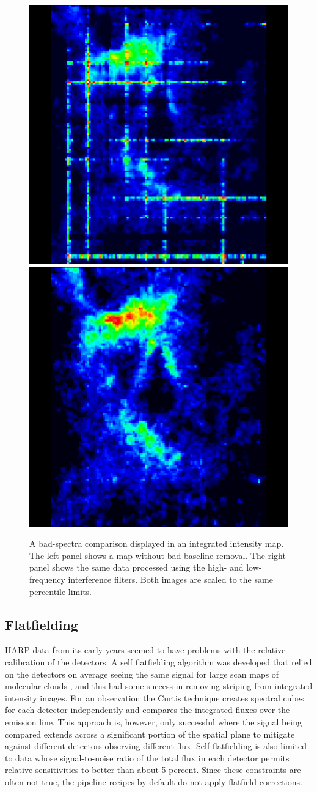 \documentclass[final,authoryear,5p,times,twocolumn]{elsarticle}
\begin{document}
\begin{figure}
\includegraphics[width=0.495\columnwidth]{NGC1333_with_badbaselines.png}
\includegraphics[width=0.495\columnwidth]{NGC1333_badbaselines_removed.png}
\caption{A bad-spectra comparison displayed in an integrated intensity map.
  The left panel shows a map without bad-baseline removal.  The right
  panel shows the same data processed using the high- and
  low-frequency interference filters.  Both images are scaled to the
  same percentile limits.}
\label{fig:badbase:results}
\end{figure}

\subsection{Flatfielding}

HARP data from its early years seemed to have problems with the
relative calibration of the detectors.  A self flatfielding algorithm
was developed that relied on the detectors on average seeing the same
signal for large scan maps of molecular clouds
\citep{2010MNRAS.401..455C}, and this had some success in removing
striping from integrated intensity images.  For an observation the
Curtis technique creates spectral cubes for each detector
independently and compares the integrated fluxes over the emission
line.  This approach is, however, only successful where the signal
being compared extends across a significant portion of the spatial
plane to mitigate against different detectors observing different
flux.  Self flatfielding is also limited to data whose signal-to-noise
ratio of the total flux in each detector permits relative
sensitivities to better than about 5 percent.  Since these constraints
are often not true, the pipeline recipes by default do not apply
flatfield corrections.
\end{document}
